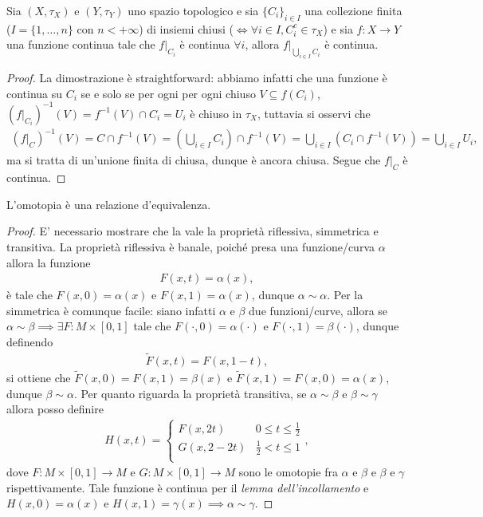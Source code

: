 \begin{lemma}
    Sia $(X, \tau_X)$ e $(Y, \tau_Y)$ uno spazio topologico e sia $\{ C_i \}_{i \in I}$ una collezione finita ($I = \{ 1, \ldots, n\}$ con $n < +\infty$) di insiemi chiusi ($\iff \forall i \in I, C_i^c \in \tau_X$) e sia $f: X \to Y$ una funzione continua tale che $f|_{C_i}$ è continua $\forall i$, allora $f|_{\bigcup_{i \in I} C_i}$ è continua.   
\end{lemma}
\begin{proof}
    La dimostrazione è straightforward: abbiamo infatti che una funzione è continua su $C_i$ se e solo se per ogni per ogni chiuso $V \subseteq f(C_i)$, $(f|_{C_i})^{-1}(V) = f^{-1}(V) \cap C_i = U_i$ è chiuso in $\tau_X$, tuttavia si osservi che
    \begin{align}
        (f|_C)^{-1}(V) = C \cap f^{-1}(V) = \left( \bigcup_{i \in I} C_i \right) \cap f^{-1}(V) = \bigcup_{i \in I} (C_i \cap f^{-1}(V)) = \bigcup_{i \in I} U_i,
    \end{align}
    ma si tratta di un'unione finita di chiusa, dunque è ancora chiusa. Segue che $f|_C$ è continua.
\end{proof}

\begin{prop}
    L'omotopia è una relazione d'equivalenza.
\end{prop}
\begin{proof}
    E' necessario mostrare che la vale la proprietà riflessiva, simmetrica e transitiva. La proprietà riflessiva è banale, poiché presa una funzione/curva $\alpha$ allora la funzione
    \begin{align}
        F(x, t) = \alpha(x),
    \end{align}
    è tale che $F(x, 0) = \alpha(x)$ e $F(x, 1) = \alpha(x)$, dunque $\alpha \sim \alpha$. Per la simmetrica è comunque facile: siano infatti $\alpha$ e $\beta$ due funzioni/curve, allora se $\alpha \sim \beta \implies \exists F: M \times [0,1]$ tale che $F(\cdot, 0) = \alpha(\cdot)$ e $F(\cdot, 1) = \beta(\cdot)$, dunque definendo
    \begin{align}
        \tilde{F}(x, t) = F(x, 1-t),
    \end{align}
    si ottiene che $\tilde{F}(x, 0) = F(x, 1) = \beta(x)$ e $\tilde{F}(x, 1) = F(x, 0) = \alpha(x)$, dunque $\beta \sim \alpha$. Per quanto riguarda la proprietà transitiva, se $\alpha \sim \beta$ e $\beta \sim \gamma$ allora posso definire
    \begin{align}
        H(x, t) = \begin{cases}
            F(x, 2t) & 0 \leq t \leq \frac{1}{2} \\
            G(x, 2 - 2t) & \frac{1}{2} < t \leq 1 \\
        \end{cases},
    \end{align}
    dove $F: M \times [0,1] \to M$ e $G: M \times [0,1] \to M$ sono le omotopie fra $\alpha$ e $\beta$ e $\beta$ e $\gamma$ rispettivamente. Tale funzione è continua per il \emph{lemma dell'incollamento} e $H(x, 0) = \alpha(x)$ e $H(x, 1) = \gamma(x) \implies \alpha \sim \gamma$.
\end{proof}

